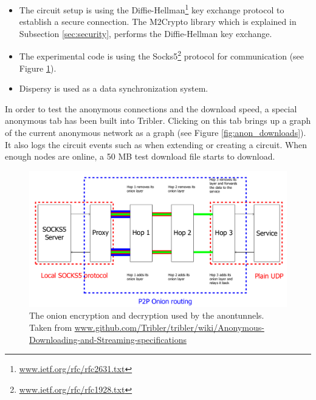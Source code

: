 			\begin{itemize} 
				\item The circuit setup is using the Diffie-Hellman\footnote{\href{http://www.ietf.org/rfc/rfc2631.txt}{www.ietf.org/rfc/rfc2631.txt}} key exchange protocol to establish a secure connection. The M2Crypto library which is explained in Subsection \ref{sec:security}, performs the Diffie-Hellman key exchange.
				\item The experimental code is using the Socks5\footnote{\href{http://www.ietf.org/rfc/rfc1928.txt}{www.ietf.org/rfc/rfc1928.txt}} protocol for communication (see Figure \ref{fig:onion_encryption_decryption_socks5}).
				\item Dispersy is used as a data synchronization system. 
			\end{itemize}
			
			In order to test the anonymous connections and the download speed, a special anonymous tab has been built into Tribler. Clicking on this tab brings up a graph of the current anonymous network as a graph (see Figure \ref{fig:anon_downloads}). It also logs the circuit events such as when extending or creating a circuit. When enough nodes are online, a 50 MB test download file starts to download.
			
			\begin{figure}[!htb]
				\centering
				\includegraphics[width=\textwidth]{graphics/onion_encryption_decryption_socks5.png}
				\caption{The onion encryption and decryption used by the anontunnels. Taken from \href{https://github.com/Tribler/tribler/wiki/Anonymous-Downloading-and-Streaming-specifications}{www.github.com/Tribler/tribler/wiki/Anonymous-Downloading-and-Streaming-specifications}}
				\label{fig:onion_encryption_decryption_socks5}
			\end{figure}

